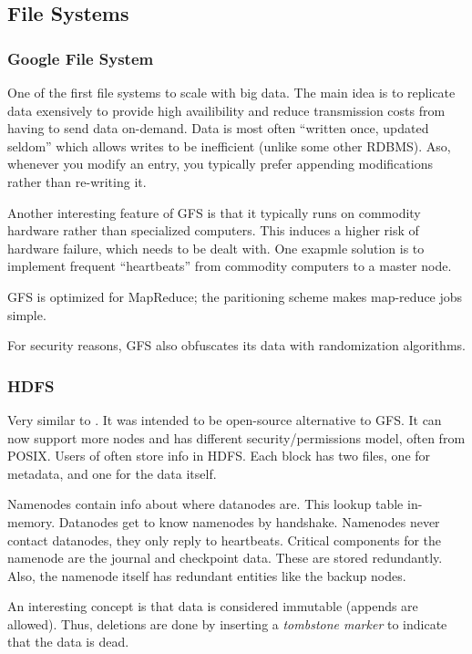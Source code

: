 \subsection{File Systems}
\subsubsection{Google File System}\label{sec:GFS}
One of the first file systems to scale with big data. The main idea is to replicate data
exensively to provide high availibility and reduce transmission costs from having to send data on-demand.
Data is most often ``written once, updated seldom'' which allows writes to be inefficient (unlike some other RDBMS). Aso, whenever you modify an entry, you typically prefer appending modifications rather than re-writing it.

Another interesting feature of GFS is that it typically runs on commodity hardware rather than
specialized computers. This induces a higher risk of hardware failure, which needs to be dealt with.
One exapmle solution is to implement frequent ``heartbeats'' from commodity computers to a master node.

GFS is optimized for MapReduce; the paritioning scheme makes map-reduce jobs simple.

For security reasons, GFS also obfuscates its data with randomization algorithms.

\subsubsection{HDFS}\label{sec:HDFS}
Very similar to . It was intended to be open-source alternative to GFS.\@
It can now support more nodes and has different security/permissions model, often from POSIX.
Users of  often store info in HDFS.
Each block has two files, one for metadata, and one for the data itself.

Namenodes contain info about where datanodes are. This lookup table in-memory.
Datanodes get to know namenodes by handshake. Namenodes never contact datanodes, they only reply
to heartbeats.
Critical components for the namenode are the journal and checkpoint data.
These are stored redundantly. Also, the namenode itself has redundant entities like the backup nodes.

An interesting concept is that data is considered immutable (appends are allowed). Thus, deletions are
done by inserting a \textit{tombstone marker} to indicate that the data is dead.

